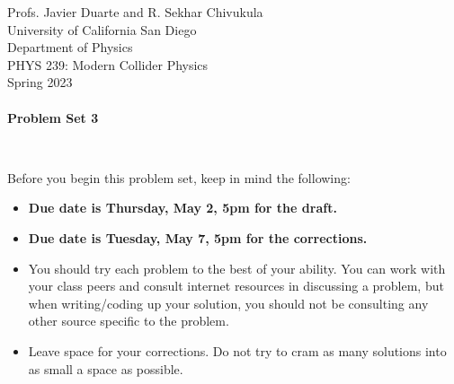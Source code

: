 \documentclass[12pt]{article}
\newif\ifsol
\newcommand{\solColor}{blue}
\newcommand{\sol}[1]{\ifsol\textcolor{\solColor}{#1}\fi}
\begin{document}
\begin{center}
Profs. Javier Duarte and R. Sekhar Chivukula\\
University of California San Diego\\
Department of Physics\\
PHYS 239: Modern Collider Physics\\
Spring 2023\\[-5pt]
\noindent\hrulefill\\[7.5pt]
{\bf \Large Problem Set 3 \sol{SOLUTIONS}}
\end{center}
\vspace{-17.5pt}
\noindent\hrulefill\\[-5pt]

{\smaller
Before you begin this problem set, keep in mind the following:
\begin{itemize}
\item \textbf{Due date is Thursday, May 2, 5pm for the draft.}
\item \textbf{Due date is Tuesday, May 7, 5pm for the corrections.}
\item You should try each problem to the best of your ability.
You can work with your class peers and consult internet resources in discussing a problem, but when writing/coding up your solution, you should not be consulting any other source specific to the problem.
\item Leave space for your corrections.
Do not try to cram as many solutions into as small a space as possible.
\end{itemize}
}

\noindent\hrulefill\\[-5pt]
\end{document}
